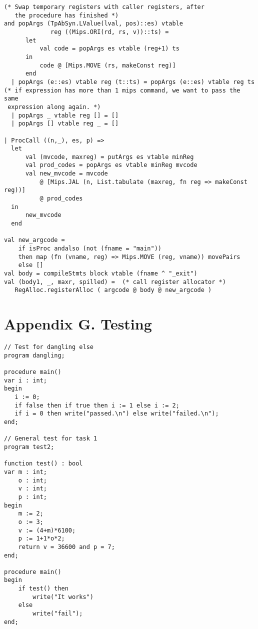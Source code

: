 \documentclass[12pt,a4paper,english]{article}
\begin{document}
\begin{lstlisting}[caption=Compiler.sml task 5]
(* Swap temporary registers with caller registers, after
   the procedure has finished *)
and popArgs (TpAbSyn.LValue(lval, pos)::es) vtable 
             reg ((Mips.ORI(rd, rs, v))::ts) =
      let 
          val code = popArgs es vtable (reg+1) ts
      in  
          code @ [Mips.MOVE (rs, makeConst reg)]
      end
  | popArgs (e::es) vtable reg (t::ts) = popArgs (e::es) vtable reg ts 
(* if expression has more than 1 mips command, we want to pass the same
 expression along again. *)
  | popArgs _ vtable reg [] = []
  | popArgs [] vtable reg _ = []

| ProcCall ((n,_), es, p) => 
  let
      val (mvcode, maxreg) = putArgs es vtable minReg
      val prod_codes = popArgs es vtable minReg mvcode
      val new_mvcode = mvcode
          @ [Mips.JAL (n, List.tabulate (maxreg, fn reg => makeConst reg))]
          @ prod_codes
  in
      new_mvcode
  end

val new_argcode = 
    if isProc andalso (not (fname = "main")) 
    then map (fn (vname, reg) => Mips.MOVE (reg, vname)) movePairs
    else []
val body = compileStmts block vtable (fname ^ "_exit")
val (body1, _, maxr, spilled) =  (* call register allocator *)
   RegAlloc.registerAlloc ( argcode @ body @ new_argcode )
\end{lstlisting}

\newpage

\section{Appendix G. Testing}
\begin{lstlisting}[caption=Two tests for task 1 one for dangling else and one for general functionality.]
// Test for dangling else
program dangling;

procedure main()
var i : int;
begin
   i := 0;
   if false then if true then i := 1 else i := 2;
   if i = 0 then write("passed.\n") else write("failed.\n");
end;

// General test for task 1
program test2;

function test() : bool
var m : int;
    o : int;
    v : int;
    p : int;
begin
    m := 2;
    o := 3;
    v := (4+m)*6100;
    p := 1+1*o*2;
    return v = 36600 and p = 7;
end;

procedure main()
begin
    if test() then 
        write("It works") 
    else 
        write("fail");
end;
\end{lstlisting}
\end{document}
